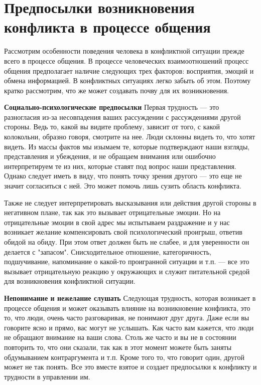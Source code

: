 \documentclass[a4paper,14pt]{extarticle}
\begin{document}
\pagebreak
\section{Предпосылки возникновения конфликта в процессе общения}

Рассмотрим особенности поведения человека в конфликтной ситуации прежде всего в процессе общения. В процессе человеческих взаимоотношений процесс общения предполагает наличие следующих трех факторов: восприятия, эмоций и обмена информацией. В конфликтных ситуациях легко забыть об этом. Поэтому кратко рассмотрим, что же может создавать почву для их возникновения.

\textbf{Социально-психологические предпосылки} Первая трудность — это разногласия из-за несовпадения ваших рассуждении с рассуждениями другой стороны. Ведь то, какой вы видите проблему, зависит от того, с какой колокольни, образно говоря, смотрите на нее. Люди склонны видеть то, что хотят видеть. Из массы фактов мы изымаем те, которые подтверждают наши взгляды, представления и убеждения, и не обращаем внимания или ошибочно интерпретируем те из них, которые ставят под вопрос наши представления. Однако следует иметь в виду, что понять точку зрения другого — это еще не значит согласиться с ней. Это может помочь лишь сузить область конфликта.

Также не следует интерпретировать высказывания или действия другой стороны в негативном плане, так как это вызывает отрицательные эмоции. Но на отрицательные эмоции в свой адрес мы испытываем раздражение и у нас возникает желание компенсировать свой психологический проигрыш, ответив обидой на обиду. При этом ответ должен быть не слабее, и для уверенности он делается с "запасом". Снисходительное отношение, категоричность, подшучивание, напоминание о какой-то проигранной ситуации и т.п. — все это вызывает отрицательную реакцию у окружающих и служит питательной средой для возникновения конфликтной ситуации.

\textbf{Непонимание и нежелание слушать} Следующая трудность, которая возникает в процессе общения и может оказывать влияние на возникновение конфликта, это то, что люди, очень часто разговаривая, не понимают друг друга. Даже если вы говорите ясно и прямо, вас могут не услышать. Как часто вам кажется, что люди не обращают внимание на ваши слова. Столь же часто и вы не в состоянии повторить то, что они сказали, так как в этот момент можете быть заняты обдумыванием контраргумента и т.п. Кроме того то, что говорит один, другой может не так понять. Все это вместе взятое и создает предпосылки к конфликту и трудности в управлении им.
\end{document}
